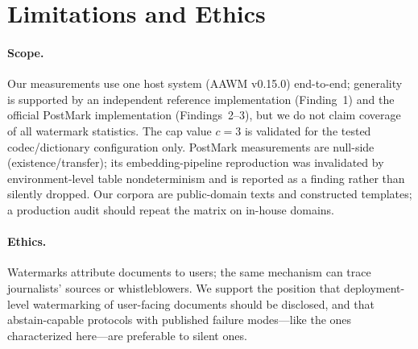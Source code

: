 \section{Limitations and Ethics}

\paragraph{Scope.}
Our measurements use one host system (AAWM v0.15.0) end-to-end; generality
is supported by an independent reference implementation (Finding~1) and the
official PostMark implementation (Findings~2--3), but we do not claim
coverage of all watermark statistics. The cap value $c{=}3$ is validated
for the tested codec/dictionary configuration only. PostMark measurements
are null-side (existence/transfer); its embedding-pipeline reproduction was
invalidated by environment-level table nondeterminism and is reported as a
finding rather than silently dropped. Our corpora are public-domain texts
and constructed templates; a production audit should repeat the matrix on
in-house domains.

\paragraph{Ethics.}
Watermarks attribute documents to users; the same mechanism can trace
journalists' sources or whistleblowers. We support the position that
deployment-level watermarking of user-facing documents should be disclosed,
and that abstain-capable protocols with published failure modes---like the
ones characterized here---are preferable to silent ones.
